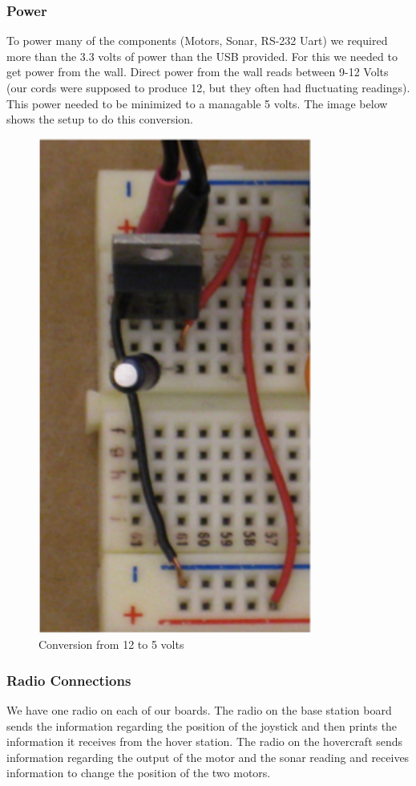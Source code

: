 \subsubsection{Power}
To power many of the components (Motors, Sonar, RS-232 Uart) we required more than the 3.3 volts of power than the USB provided. For this we needed to get power from the wall. Direct power from the wall reads between 9-12 Volts (our cords were supposed to produce 12, but they often had fluctuating readings).  This power needed to be minimized to a managable 5 volts.  The image below shows the setup to do this conversion.
\begin{figure}[h]
  \begin{center}
    \includegraphics[width=90mm]{imageSources/power12to5.png}
  \end{center}
  \caption{Conversion from 12 to 5 volts} 
  \label{power12to5}
\end{figure}

\subsubsection{Radio Connections}
We have one radio on each of our boards. The radio on the base station board sends the information regarding the position of the joystick and then prints the information it receives from the hover station.  The radio on the hovercraft sends information regarding the output of the motor and the sonar reading and receives information to change the position of the two motors.

